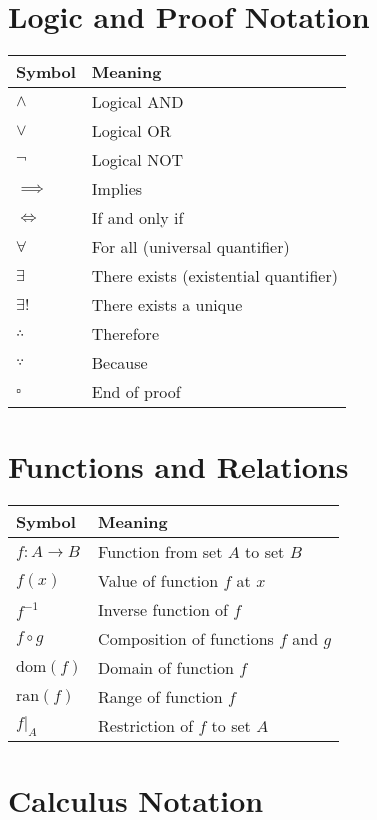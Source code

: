 \section{Logic and Proof Notation}

\begin{tabular}{|l|l|}
\hline
\textbf{Symbol} & \textbf{Meaning} \\
\hline
$\land$ & Logical AND \\
$\lor$ & Logical OR \\
$\neg$ & Logical NOT \\
$\implies$ & Implies \\
$\iff$ & If and only if \\
$\forall$ & For all (universal quantifier) \\
$\exists$ & There exists (existential quantifier) \\
$\exists!$ & There exists a unique \\
$\therefore$ & Therefore \\
$\because$ & Because \\
$\square$ & End of proof \\
\hline
\end{tabular}

\section{Functions and Relations}

\begin{tabular}{|l|l|}
\hline
\textbf{Symbol} & \textbf{Meaning} \\
\hline
$f: A \to B$ & Function from set $A$ to set $B$ \\
$f(x)$ & Value of function $f$ at $x$ \\
$f^{-1}$ & Inverse function of $f$ \\
$f \circ g$ & Composition of functions $f$ and $g$ \\
$\text{dom}(f)$ & Domain of function $f$ \\
$\text{ran}(f)$ & Range of function $f$ \\
$f|_A$ & Restriction of $f$ to set $A$ \\
\hline
\end{tabular}

\section{Calculus Notation}

